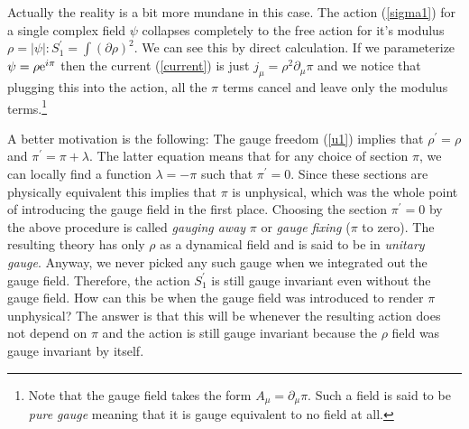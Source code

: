 \documentclass[12pt]{article}
\begin{document}
Actually the reality is a bit more mundane in this case. The action (\ref{sigma1}) for a single complex field $\psi$ collapses completely to the free action for it's modulus $\rho=|\psi|:S^\prime_1=\int (\partial \rho)^2$. We can see this by direct calculation. If we parameterize $\psi=\rho {\rm e}^{i \pi}$ then the current (\ref{current}) is just $j_\mu =\rho^2 \partial_\mu \pi$ and we notice that plugging this into the action, all the $\pi$ terms cancel and leave only the modulus terms.\footnote{Note that the gauge field takes the form $A_\mu=\partial_\mu \pi$. Such a field is said to be {\em pure gauge} meaning that it is gauge equivalent to no field at all.}

A better motivation is the following: The gauge freedom (\ref{u1}) implies that $\rho^\prime=\rho$ and $\pi^\prime =\pi+\lambda$. The latter equation means that for any choice of section $\pi$, we can locally find a function $\lambda=-\pi$ such that $\pi^\prime=0$. Since these sections are physically equivalent this implies that $\pi$ is unphysical, which was the whole point of introducing the gauge field in the first place. Choosing the section $\pi^\prime=0$ by the above procedure is called {\em gauging away} $\pi$ or {\em gauge fixing} ($\pi$ to zero). The resulting theory has only $\rho$ as a dynamical field and is said to be in {\em unitary gauge}. Anyway, we never picked any such gauge when we integrated out the gauge field. Therefore, the action $S^\prime_1$ is still gauge invariant even without the gauge field. How can this be when the gauge field was introduced to render $\pi$ unphysical? The answer is that this will be whenever the resulting action does not depend on $\pi$ and the action is still gauge invariant because the $\rho$ field was gauge invariant by itself. 
\end{document}

